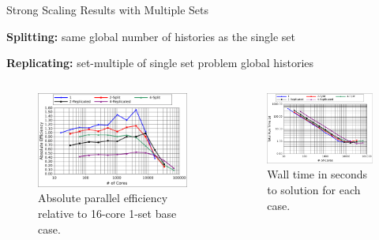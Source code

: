 \documentclass{beamer}
\begin{document}
\begin{frame}{Strong Scaling Results with Multiple Sets}

  \textbf{Splitting:} same global number of histories as the single
  set

  \bigskip 

  \textbf{Replicating:} set-multiple of single set problem global
  histories

  \begin{columns}
    \begin{column}{0.5\textwidth}

      \begin{figure}[htpb!]
        \begin{center}
          \includegraphics[width=2.35in]{titan_strong_ms_eff.pdf}
        \end{center}
        \caption{\small{Absolute parallel efficiency relative to
            16-core 1-set base case.}}
      \end{figure}

    \end{column}

    \begin{column}{0.5\textwidth}

      \begin{figure}[htpb!]
        \begin{center}
          \includegraphics[width=2.35in]{titan_strong_ms_time.pdf}
        \end{center}
        \caption{\small{Wall time in seconds to solution for each
            case.}}
      \end{figure}

    \end{column}
  \end{columns}

\end{frame}
\end{document}
